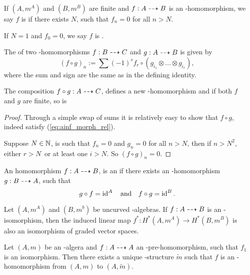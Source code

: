 \begin{defn}
If $(A,m^A)$ and $(B,m^B)$ are finite and $f:A \dashrightarrow B$ is an \Ainf-homomorphism, we say $f$ is  if there exists $N$, such that $f_n = 0$ for all $n > N$.

If $N = 1$ and $f_0 = 0$, we say $f$ is .
\end{defn}

\begin{defn}
\label{def:Ainf_comp}
The  of two \Ainf-homomorphisms $f: B \dashrightarrow C$ and $g: A \dashrightarrow B$ is given
by
\begin{equation}
\label{eq:ainf_comp_rel}
(f \circ g)_n := \sum (-1)^s f_r \circ (g_{i_1} \otimes ... \otimes
g_{i_r}),
\end{equation}
where the sum and sign are the same as in the defining identity.
\end{defn}

\begin{lemma}
The composition $f \circ g: A \dashrightarrow C$, defines a new \Ainf-homomorphism and if both
$f$ and $g$ are finite, so is 
\end{lemma}

\begin{proof}
Through a simple swap of sums it is relatively easy to show that $f\circ g$,
indeed satisfy (\ref{eq:ainf_morph_rel}). 

Suppose $N\in \mathbb{N}$, is such that $f_n = 0$ and $g_n = 0$ for all $n > N$, then if
$n > N^2$, either $r > N$ or at least one $i > N$. So $(f \circ g)_n = 0$.
\end{proof}

\begin{defn}
An \Ainf homomorphism $f: A\dashrightarrow B$, is an  if there exists an 
\Ainf-homomorphism $g: B\dashrightarrow A$, such that \[ g \circ f = \operatorname{id}^A \quad\text{and}\quad f \circ g = \operatorname{id}^B. \]
\end{defn}

\begin{lemma}
\label{prop:Ainf_iso_induced}
Let $(A,m^A)$ and $(B,m^b)$ be uncurved \Ainf-algebras. If $f: A \dashrightarrow B$ is
an \Ainf-isomorphism, then the induced linear map $f^*: H^*(A,m^A) \to
H^*(B,m^B)$ is also an isomorphism of graded vector spaces.
\end{lemma}



\begin{lemma}
\label{lemma:Ainf_struct_from_pre_hom}
Let $(A,m)$ be an \Ainf-algera and $f : A \dashrightarrow A$ an \Ainf-pre-homomorphism,
such that $f_1$ is an isomorphism. Then there exists a unique \Ainf-structure
$\tilde{m}$ such that $f$ is an \Ainf-homomorphism from $(A,m)$ to
$(A,\tilde{m})$.
\end{lemma}

